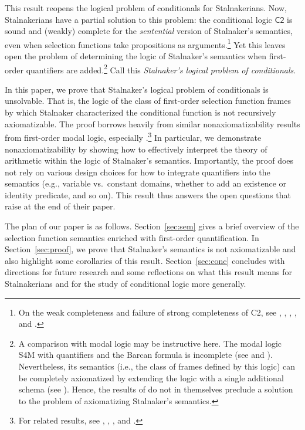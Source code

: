 \documentclass[12pt]{article}
\begin{document}
This result reopens the logical problem of conditionals for Stalnakerians. 
Now, Stalnakerians have a partial solution to this problem: the conditional logic $\mathsf{C2}$ is sound and (weakly) complete for the \emph{sentential} version of Stalnaker's semantics, even when selection functions take propositions as arguments.\footnote{On the weak completeness and failure of strong completeness of \textsf{C2}, see \cite[Section~6]{vanFraassen1974hiddenvariables}, \cite[p.~105]{Veltman1985logics}, \cite[fn.~2]{fine2012difficulty}, \cite{kocurek2025stalnaker}, and \cite{dorr2024logic}.} 
Yet this leaves open the problem of determining the logic of Stalnaker's semantics when first-order quantifiers are added.\footnote{A comparison with modal logic may be instructive here. The modal logic \textsf{S4M} with quantifiers and the Barcan formula is incomplete (see \cite{Kripke1967Lemmon2} and \cite[pp.~265--270]{HughesCresswell1996}). Nevertheless, its semantics (i.e., the class of frames defined by this logic) can be completely axiomatized by extending the logic with a single additional schema (see \cite[pp.~159--164]{Cresswell2001howtocomplete}). Hence, the results of \cite{KocurekWalshWeissA} do not in themselves preclude a solution to the problem of axiomatizing Stalnaker's semantics.} 
Call this \emph{Stalnaker's logical problem of conditionals}. 

In this paper, we prove that Stalnaker's logical problem of conditionals is unsolvable. 
That is, the logic of the class of first-order selection function frames by which Stalnaker characterized the conditional function is not recursively axiomatizable. 
The proof borrows heavily from similar nonaxiomatizability results from first-order modal logic, especially \cite{Cresswell1997incompletable}.\footnote{For related results, see \cite{Kamp1977relatedtheorems}, \cite{Montagna1984provability}, \cite[Section~3]{Garson1984quantification}, and \cite{Rybakov2024incompleteness}.}  
In particular, we demonstrate nonaxiomatizability by showing how to effectively interpret the theory of arithmetic within the logic of Stalnaker's semantics. 
Importantly, the proof does not rely on various design choices for how to integrate quantifiers into the semantics (e.g., variable vs.\ constant domains, whether to add an existence or identity predicate, and so on). 
This result thus answers the open questions that \cite{KocurekWalshWeissA} raise at the end of their paper. 

The plan of our paper is as follows. 
Section~\ref{sec:sem} gives a brief overview of the selection function semantics enriched with first-order quantification. 
In Section~\ref{sec:proof}, we prove that Stalnaker's semantics is not axiomatizable and also highlight some corollaries of this result. 
Section~\ref{sec:conc} concludes with directions for future research and some reflections on what this result means for Stalnakerians and for the study of conditional logic more generally.
\end{document}
